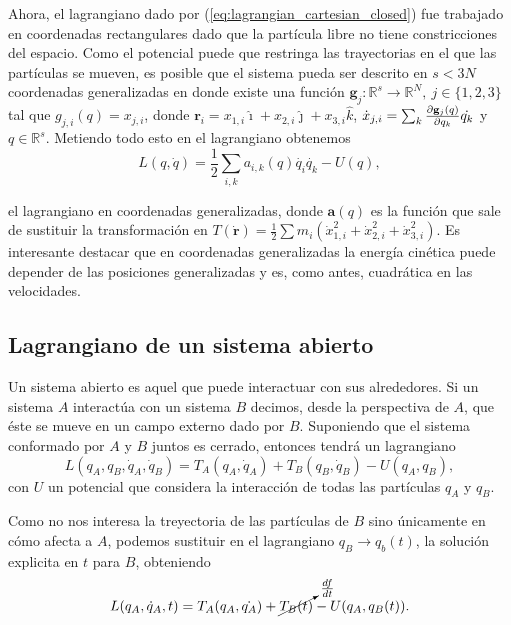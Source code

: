 Ahora, el lagrangiano dado por (\ref{eq:lagrangian_cartesian_closed}) fue trabajado en coordenadas rectangulares dado que la partícula libre no tiene constricciones del espacio. Como el potencial puede que restringa las trayectorias en el que las partículas se mueven, es posible que el sistema pueda ser descrito en $s < 3N$  coordenadas generalizadas en donde existe una función $\mathbf{g}_j: \mathbb{R}^{s} \to \mathbb{R}^{N}, \ j \in \{1,2,3\}$ tal que $g_{j,i}(q) = x_{j,i}$, donde $\mathbf{r}_i = x_{1,i} \hat{\imath} + x_{2,i} \hat{\jmath} + x_{3,i} \hat{k}$, $\dot{x}_{j,i} = \sum_k \frac{\partial \mathbf{g}_j(q)}{\partial q_k} \dot{q_k}$ y $q \in \mathbb{R}^s$. Metiendo todo esto en el lagrangiano obtenemos
\begin{equation}
 L(q,\dot{q}) = \frac{1}{2}\sum_{i,k} a_{i,k}(q) \dot{q_i}\dot{q_k} - U(q),
 \label{eq:lagrangian_closed_generalized}
\end{equation}

el lagrangiano en coordenadas generalizadas, donde $\mathbf{a}(q)$ es la función que sale de sustituir la transformación en $T(\dot{\mathbf{r}}) = \frac{1}{2}\sum m_i \left( \dot{x}_{1,i}^2 + \dot{x}_{2,i}^2 + \dot{x}_{3,i}^2 \right)$. Es interesante destacar que en coordenadas generalizadas la energía cinética puede depender de las posiciones generalizadas y es, como antes, cuadrática en las velocidades. 

\subsection{Lagrangiano de un sistema abierto}

Un sistema abierto es aquel que puede interactuar con sus alrededores. Si un sistema $A$ interactúa con un sistema $B$ decimos, desde la perspectiva de $A$, que éste se mueve en un campo externo dado por $B$. Suponiendo que el sistema conformado por $A$ y $B$ juntos es cerrado, entonces tendrá un lagrangiano 
\begin{equation}
 L(q_A,q_B,\dot{q}_A,\dot{q}_B) = T_A(q_A,\dot{q}_A) + T_B(q_B,\dot{q}_B) - U(q_A,q_B),
\end{equation}
con $U$ un potencial que considera la interacción de todas las partículas $q_A$ y $q_B$.

Como no nos interesa la treyectoria de las partículas de $B$ sino únicamente en cómo afecta a $A$, podemos sustituir  en el lagrangiano $q_B \to q_b(t)$, la solución explicita en $t$ para $B$, obteniendo
\begin{align*}
 L(q_A,\dot{q}_A,t) = T_A(q_A,\dot{q_A}) + \cancelto{\frac{df}{dt}}{T_B(t)} - U(q_A,q_B(t)).
\end{align*}

